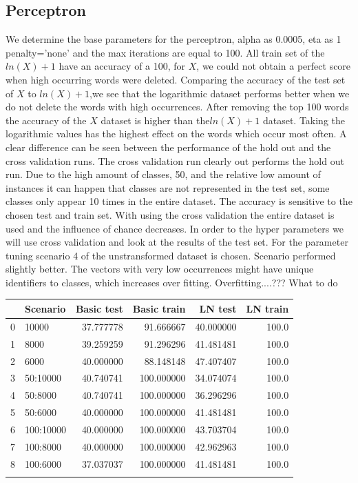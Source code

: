 \documentclass[11pt]{article}
\begin{document}
\subsection{Perceptron}
We determine the base parameters for the perceptron, alpha as 0.0005, eta as 1 penalty='none' and the max iterations are equal to 100. 
\newline
All train set of the $ln(X)+1$ have an accuracy of a 100, for $X$, we could not obtain a perfect score when high occurring words were deleted. 
Comparing the accuracy of the test set of $X$ to $ln(X)+1$,we see that the logarithmic dataset performs better when we do not delete the words with high occurrences. After removing the top 100 words the accuracy of the $X$ dataset is higher than the$ln(X)+1$ dataset. Taking the logarithmic values has the highest effect on the words which occur most often.
\newline
A clear difference can be seen between the performance of the hold out and the cross validation runs. The cross validation run clearly out performs the hold out run. Due to the high amount of classes, 50, and the relative low amount of instances it can happen that classes are not represented in the test set, some classes only appear 10 times in the entire dataset. The accuracy is sensitive to the chosen test and train set. With using the cross validation the entire dataset is used and the influence of chance decreases. In order to the hyper parameters we will use cross validation and look at the results of the test set. For the parameter tuning scenario 4 of the unstransformed dataset is chosen. Scenario performed slightly better. The vectors with very low occurrences might have unique identifiers to classes, which increases over fitting. 
\newline
Overfitting....??? What to do
   
\begin{tabular}{llrrrr}
\toprule
{} &   Scenario &  Basic test &  Basic train &    LN test &  LN train \\
\midrule
0 &      10000 &   37.777778 &    91.666667 &  40.000000 &     100.0 \\
1 &       8000 &   39.259259 &    91.296296 &  41.481481 &     100.0 \\
2 &       6000 &   40.000000 &    88.148148 &  47.407407 &     100.0 \\
3 &   50:10000 &   40.740741 &   100.000000 &  34.074074 &     100.0 \\
4 &    50:8000 &   40.740741 &   100.000000 &  36.296296 &     100.0 \\
5 &    50:6000 &   40.000000 &   100.000000 &  41.481481 &     100.0 \\
6 &  100:10000 &   40.000000 &   100.000000 &  43.703704 &     100.0 \\
7 &   100:8000 &   40.000000 &   100.000000 &  42.962963 &     100.0 \\
8 &   100:6000 &   37.037037 &   100.000000 &  41.481481 &     100.0 \\
\bottomrule
\label{tab:Accuracy perceptron hold out}
\end{tabular}
\end{document}
